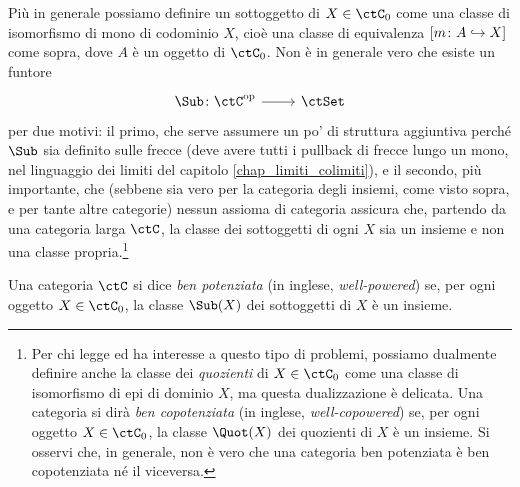 \begin{definition}\label{def_sottoggetto}
 Più in generale possiamo definire un sottoggetto di \(X\in\ctC_0\) come una classe di isomorfismo di	mono di codominio \(X\), cioè una classe di equivalenza \([m \colon A\hookrightarrow X]\) come sopra, dove \(A\) è un oggetto di \(\ctC_0\). Non è in generale vero che esiste un funtore
 \[\dmFun{\Sub}{\ctC^\op}{\ctSet}\]
 per due motivi: il primo, che serve assumere un po' di struttura aggiuntiva perché \(\Sub\) sia definito sulle frecce (deve avere tutti i pullback di frecce lungo un mono, nel linguaggio dei limiti del capitolo \ref{chap_limiti_colimiti}), e il secondo, più importante, che (sebbene sia vero per la categoria degli insiemi, come visto sopra, e per tante altre categorie) nessun assioma di categoria assicura che, partendo da una categoria larga \(\ctC\), la classe dei sottoggetti di ogni \(X\) sia un insieme e non una classe propria.\footnote{Per chi legge ed ha interesse a questo tipo di problemi, possiamo dualmente definire anche la classe dei \emph{quozienti} di \(X\in\ctC_0\) come una classe di isomorfismo di epi di dominio \(X\), ma questa dualizzazione è delicata. Una categoria si dirà \emph{ben copotenziata} (in inglese, \emph{well-copowered}) se, per ogni oggetto \(X\in\ctC_0\), la classe \(\Quot(X)\) dei quozienti di \(X\) è un insieme. Si osservi che, in generale, non è vero che una categoria ben potenziata è ben copotenziata né il viceversa.}
\end{definition}
\begin{definition}\label{def_cat_ben_potenziata}
 Una categoria \(\ctC\) si dice \emph{ben potenziata} (in inglese, \emph{well-powered}) se, per ogni oggetto \(X\in\ctC_0\), la classe \(\Sub(X)\) dei sottoggetti di \(X\) è un insieme.
\end{definition}
